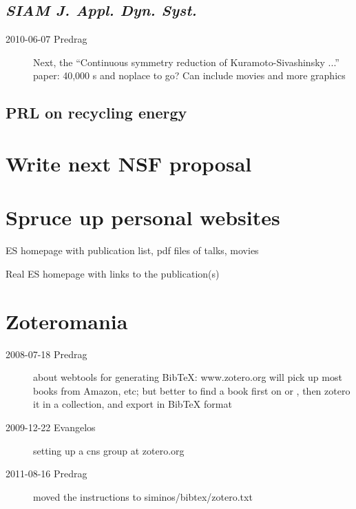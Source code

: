 \subsection{\emph{SIAM J. Appl. Dyn. Syst.}}

\begin{description}

\item[2010-06-07 Predrag] Next, the
``Continuous symmetry reduction of Kuramoto-Sivashinsky ...'' paper:
40,000 \rpo s and noplace to go?
Can include movies and more graphics

\end{description}

\subsection{PRL on recycling energy}

\section{Write next NSF proposal }

\section{Spruce up personal websites}

ES homepage with publication list, pdf files of talks, movies

Real ES homepage with links to the publication(s)

\section{Zoteromania}

\begin{description}

\item[2008-07-18 Predrag] about webtools for generating BibTeX:
www.zotero.org
        will pick up most books from Amazon, etc; but
        better to find a book first on
          or
, then zotero it
          in a collection, and export in BibTeX format

\item[2009-12-22 Evangelos]
setting up a cns group at zotero.org

\item[2011-08-16 Predrag] moved the instructions to siminos/bibtex/zotero.txt

\end{description}

